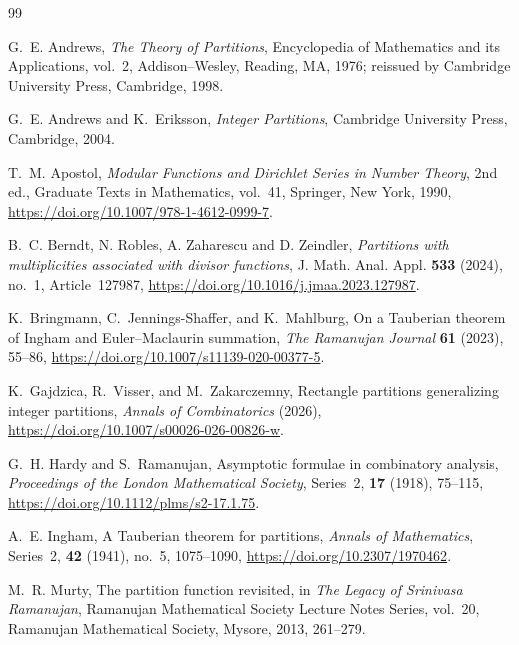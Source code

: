 \documentclass[12pt,a4paper]{amsart}
\numberwithin{equation}{section}
\theoremstyle{plain}
\theoremstyle{definition}
\theoremstyle{remark}
\begin{document}
\begin{thebibliography}{99}



G.~E. Andrews,
\emph{The Theory of Partitions},
Encyclopedia of Mathematics and its Applications, vol.~2,
Addison--Wesley, Reading, MA, 1976;
reissued by Cambridge University Press, Cambridge, 1998.

G.~E. Andrews and K.~Eriksson,
\emph{Integer Partitions},
Cambridge University Press, Cambridge, 2004.

T.~M. Apostol,
\emph{Modular Functions and Dirichlet Series in Number Theory},
2nd ed.,
Graduate Texts in Mathematics, vol.~41,
Springer, New York, 1990,
\url{https://doi.org/10.1007/978-1-4612-0999-7}.


B.~C. Berndt, N. Robles, A. Zaharescu and D. Zeindler,
\emph{Partitions with multiplicities associated with divisor functions},
J. Math. Anal. Appl. \textbf{533} (2024), no.~1, Article~127987,
\url{https://doi.org/10.1016/j.jmaa.2023.127987}.

K.~Bringmann, C.~Jennings-Shaffer, and K.~Mahlburg,
On a Tauberian theorem of Ingham and Euler--Maclaurin summation,
\emph{The Ramanujan Journal}
\textbf{61} (2023), 55--86,
\url{https://doi.org/10.1007/s11139-020-00377-5}.

K.~Gajdzica, R.~Visser, and M.~Zakarczemny,
Rectangle partitions generalizing integer partitions,
\emph{Annals of Combinatorics} (2026),
\url{https://doi.org/10.1007/s00026-026-00826-w}.

G.~H. Hardy and S.~Ramanujan,
Asymptotic formulae in combinatory analysis,
\emph{Proceedings of the London Mathematical Society},
Series~2, \textbf{17} (1918), 75--115,
\url{https://doi.org/10.1112/plms/s2-17.1.75}.

A.~E. Ingham,
A Tauberian theorem for partitions,
\emph{Annals of Mathematics},
Series~2, \textbf{42} (1941), no.~5, 1075--1090,
\url{https://doi.org/10.2307/1970462}.

M.~R. Murty,
The partition function revisited,
in \emph{The Legacy of Srinivasa Ramanujan},
Ramanujan Mathematical Society Lecture Notes Series,
vol.~20,
Ramanujan Mathematical Society, Mysore, 2013, 261--279.




\end{thebibliography}
\end{document}
